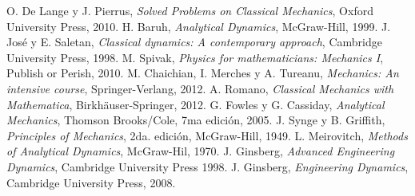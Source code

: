 \documentclass[a4paper,10pt]{article}
\numberwithin{equation}{section}
\begin{document}
\newpage

\begin{thebibliography}{20}
 O. De Lange y J. Pierrus, \emph{Solved Problems on Classical Mechanics}, Oxford 
 University Press, 2010.
 H. Baruh, \emph{Analytical Dynamics}, McGraw-Hill, 1999.
 J. José y E. Saletan, \emph{Classical dynamics: A contemporary approach}, Cambridge University Press,
 1998.
 M. Spivak, \emph{Physics for mathematicians: Mechanics I}, Publish or Perish,
 2010.
 M. Chaichian, I. Merches y A. Tureanu, \emph{Mechanics: An intensive course}, Springer-Verlang,
 2012.
 A. Romano, \emph{Classical Mechanics with Mathematica\textregistered}, Birkhäuser-Springer, 
 2012.
 G. Fowles y G. Cassiday, \emph{Analytical Mechanics}, Thomson Brooks/Cole, 
 7ma edición, 2005.
 J. Synge y B. Griffith, \emph{Principles of Mechanics}, 2da. edición, McGraw-Hill, 
 1949.
 L. Meirovitch, \emph{Methods of Analytical Dynamics}, McGraw-Hil, 1970.
 J. Ginsberg, \emph{Advanced Engineering Dynamics}, Cambridge University Press 1998.
 J. Ginsberg, \emph{Engineering Dynamics}, Cambridge University Press, 2008.
\end{thebibliography}
\end{document}

